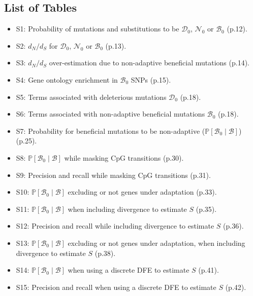 \documentclass{article}
\newcommand{\proba}{\mathbb{P}}
\newcommand{\dn}{d_N}
\newcommand{\ds}{d_S}
\newcommand{\dnds}{\dn / \ds}
\newcommand{\SphyDel}{\mathcal{D}_0}
\newcommand{\SphyNeu}{\mathcal{N}_0}
\newcommand{\SphyBen}{\mathcal{B}_0}
\newcommand{\given}{\mid}
\newcommand{\Spop}{S}
\newcommand{\SpopBen}{\mathcal{B}}
\begin{document}
    \newpage
    \subsection*{List of Tables}
    \begin{itemize}
    \item S1: Probability of mutations and substitutions to be $\SphyDel$, $\SphyNeu$ or $\SphyBen$ (p.12).
    \item S2: $\dnds$ for $\SphyDel$, $\SphyNeu$ or $\SphyBen$ (p.13).
    \item S3: $\dnds$ over-estimation due to non-adaptive beneficial mutations (p.14).
    \item S4: Gene ontology enrichment in $\SphyBen$ SNPs (p.15).
    \item S5: Terms associated with deleterious mutations $\SphyDel$ (p.18).
    \item S6: Terms associated with non-adaptive beneficial mutations $\SphyBen$ (p.18).
    \item S7: Probability for beneficial mutations to be non-adaptive ($\proba[\SphyBen\given \SpopBen ]$) (p.25).
    \item S8: $\proba[\SphyBen\given \SpopBen ]$ while masking CpG transitions (p.30).
    \item S9: Precision and recall while masking CpG transitions (p.31).
    \item S10: $\proba[\SphyBen\given \SpopBen ]$ excluding or not genes under adaptation (p.33).
    \item S11: $\proba[\SphyBen\given \SpopBen ]$ when including divergence to estimate $\Spop$ (p.35).
    \item S12: Precision and recall while including divergence to estimate $\Spop$ (p.36).
    \item S13: $\proba[\SphyBen\given \SpopBen ]$ excluding or not genes under adaptation, when including divergence to estimate $\Spop$ (p.38).
    \item S14: $\proba[\SphyBen\given \SpopBen ]$ when using a discrete DFE to estimate $\Spop$ (p.41).
    \item S15: Precision and recall when using a discrete DFE to estimate $\Spop$ (p.42).
    \end{itemize}
\end{document}
